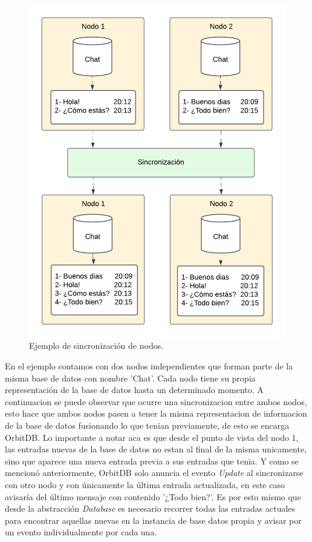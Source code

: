\begin{figure}[H]
    \centering
    \includegraphics[width=0.7\linewidth]{img/solucion-ipfs/ejemplo-sincronizacion.png}
    \caption{Ejemplo de sincronización de nodos.}
    \label{fig:ejemplo-sincronizacion}
\end{figure}

En el ejemplo contamos con dos nodos independientes que forman parte de la misma base de datos con nombre 'Chat'. Cada nodo tiene su propia representación de la base de datos hasta un determinado momento. A continuacion se puede observar que ocurre una sincronizacion entre ambos nodos, esto hace que ambos nodos pasen a tener la misma representacion de informacion de la base de datos fusionando lo que tenian previamente, de esto se encarga OrbitDB. Lo importante a notar aca es que desde el punto de vista del nodo 1, las entradas nuevas de la base de datos no estan al final de la misma unicamente, sino que aparece una nueva entrada previa a sus entradas que tenia. Y como se mencionó anteriormente, OrbitDB solo anuncia el evento \textit{Update} al sincronizarse con otro nodo y con únicamente la última entrada actualizada, en este caso avisaría del último mensaje con contenido '¿Todo bien?'. Es por esto mismo que desde la abstracción \textit{Database} es necesario recorrer todas las entradas actuales para encontrar aquellas nuevas en la instancia de base datos propia y avisar por un evento individualmente por cada una. 

